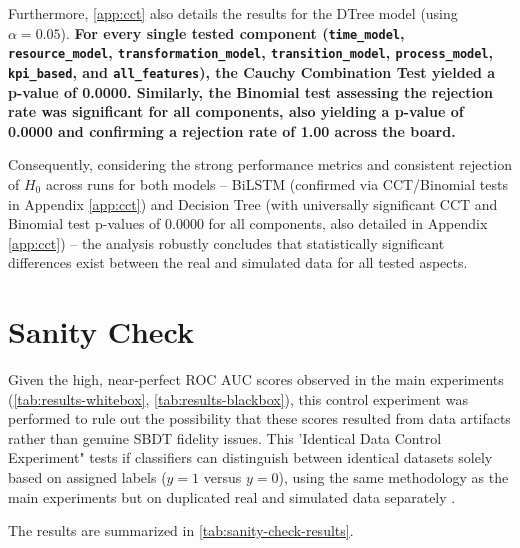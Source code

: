 Furthermore, \autoref{app:cct} also details the results for the DTree model (using $\alpha = 0.05$). \textbf{For every single tested component (\texttt{time\_model}, \texttt{resource\_model}, \texttt{transformation\_model}, \texttt{transition\_model}, \texttt{process\_model}, \texttt{kpi\_based}, and \texttt{all\_features}), the Cauchy Combination Test yielded a p-value of 0.0000. Similarly, the Binomial test assessing the rejection rate was significant for all components, also yielding a p-value of 0.0000 and confirming a rejection rate of 1.00 across the board.}

Consequently, considering the strong performance metrics and consistent rejection of $H_0$ across runs for both models – BiLSTM (confirmed via CCT/Binomial tests in Appendix \ref{app:cct}) and Decision Tree (with universally significant CCT and Binomial test p-values of 0.0000 for all components, also detailed in Appendix \ref{app:cct}) – the analysis robustly concludes that statistically significant differences exist between the real and simulated data for all tested aspects.



\section{Sanity Check}
\label{sec:sanity-check}

Given the high, near-perfect ROC AUC scores observed in the main experiments (\autoref{tab:results-whitebox}, \autoref{tab:results-blackbox}), this control experiment was performed to rule out the possibility that these scores resulted from data artifacts rather than genuine SBDT fidelity issues. This 'Identical Data Control Experiment" tests if classifiers can distinguish between identical datasets solely based on assigned labels ($y=1$ versus $y=0$), using the same methodology as the main experiments but on duplicated real and simulated data separately \autocite{adebayo2018sanity}.

The results are summarized in \autoref{tab:sanity-check-results}.

